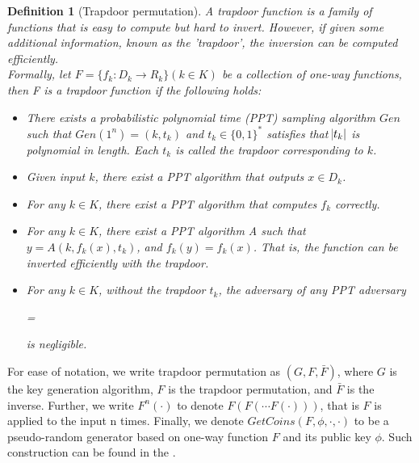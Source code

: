 \documentclass[10pt]{book}
\newtheorem{definition}{Definition}
\begin{document}
\begin{definition}[Trapdoor permutation]
	A trapdoor function is a family of functions that is easy to compute but hard to invert. However, if given some additional information, known as the 'trapdoor', the inversion can be computed efficiently. \\
	Formally, let $F = \{f_k : D_k \rightarrow R_k\} (k \in K)$ be a collection of one-way functions, then F is a trapdoor function if the following holds:
	\begin{itemize}
		\item
		There exists a probabilistic polynomial time (PPT) sampling algorithm $Gen$ such that $Gen(1^n) = (k, t_k)$ and $t_k \in \{0,1\}^*$ satisfies that $\abs{t_k}$ is polynomial in length. Each $t_k$ is called the trapdoor corresponding to $k$.
		\item
		Given input $k$, there exist a PPT algorithm that outputs $x \in  D_k$.
		\item
		For any $k \in K$, there exist a PPT algorithm that computes $f_k$ correctly.
		\item
		For any $k \in K$, there exist a PPT algorithm A such that $y = A(k, f_k(x), t_k)$, and $f_k(y) = f_k(x)$. That is, the function can be inverted efficiently with the trapdoor.
		\item
		For any $k \in K$, without the trapdoor $t_k$, the adversary of any PPT adversary
		\begin{center}
			 = 
		\end{center}
		is negligible.
	\end{itemize} 
\end{definition}

For ease of notation, we write trapdoor permutation as $(G, F, \bar{F})$, where $G$ is the key generation algorithm, $F$ is the trapdoor permutation, and $\bar{F}$ is the inverse. Further, we write $F^n(\cdot)$ to denote $F(F(\cdots F(\cdot)))$, that is $F$ is applied to the input n times. Finally, we denote $GetCoins(F, \phi, \cdot, \cdot)$ to be a pseudo-random generator based on one-way function $F$ and its public key $\phi$. Such construction can be found in the \cite{doi:10.1137/0213053, 4568378, Goldreich:1989:HPO:73007.73010}.
\end{document}
